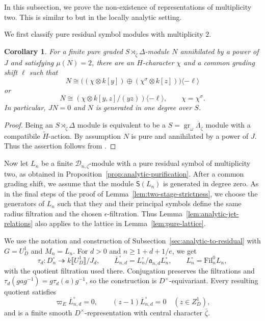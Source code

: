 \documentclass[11pt]{article}
\newtheorem{corollary}[theorem]{Corollary}
\theoremstyle{definition}
\newcommand{\gr}{\operatorname{gr}}
\begin{document}
In this subsection, we prove the non-existence of representations of multiplicity two. 
This is similar to \cite[Corollary~3.12]{HuWangPadic} but in the locally analytic setting.

We first classify pure residual symbol modules with multiplicity $2$.
\begin{corollary}\label{cor:two-symbol-classification}
For a finite pure graded $S\rtimes_{\bar\zeta}\Delta$-module $N$ 
annihilated by a power of $J$ and satisfying $\mu(N)=2$, there are an
$H$-character $\chi$ and a common grading shift $\ell$ such that
\[
 N\cong\bigl((\chi\otimes k[y])\oplus
       (\chi^\sigma\otimes k[z])\bigr)\langle-\ell\rangle
\]
or
\[
 N\cong(\chi\otimes k[y,z]/(yz))\langle-\ell\rangle,
 \qquad\chi=\chi^\sigma.
\]
In particular, $JN=0$ and $N$ is generated in one degree over $S$.
\end{corollary}
\begin{proof}
Being an $S\rtimes_{\bar\zeta}\Delta$ module is equivalent to be a $S=\gr_\omega\overline{\Lambda}_{\bar\zeta}$ module with a compatibile $\widetilde{H}$-action. 
By assumption $N$ is pure and annihilated by a power of $J$. Thus the assertion follows from \cite[Lemma~3.7]{HuWangPadic}.
\end{proof}

Now let $L_n$ be a finite $\mathscr D_{n,\zeta}$-module with a pure
residual symbol of multiplicity two, as obtained in
Proposition~\ref{prop:analytic-purification}.
After a common grading shift, we assume that the module $\mathsf S(L_n)$ is generated in degree zero.
As in the final steps of the proof of Lemma~\ref{lem:two-stage-strictness}, 
we choose the generators of $L_n$ such that they and their principal symbols 
define the same radius filtration and the chosen
$\epsilon$-filtration. Thus Lemma~\ref{lem:analytic-jet-relations}
also applies to the lattice in Lemma~\ref{lem:pure-lattice}.

We use the notation and construction of
Subsection~\ref{sec:analytic-to-residual} with $G=U_D^1$ and
$M_n=L_n$. For $d>0$ and $n\geq1+d+1/e$, we get
\[
 \tau_d:D_n^\circ\twoheadrightarrow
       k\llbracket U_D^1\rrbracket/J_d,\qquad
 \overline L_{n,d}^\circ=L_n^\circ/\mathfrak a_{n,d}L_n^\circ,
 \qquad L_n^\circ=\mathrm{Fil}_n^0L_n,
\]
with the quotient filtration used there.
Conjugation preserves the filtrations and
$\tau_d(gag^{-1})=g\tau_d(a)g^{-1}$, so the construction is
$D^\times$-equivariant. Every resulting quotient satisfies
\[
 \varpi_E\overline{L}_{n,d}^{\circ}=0,\qquad
 (z-1)\overline{L}_{n,d}^{\circ}=0\quad(z\in Z_D^1),
\]
and is a finite smooth $D^\times$-representation with central
character $\bar\zeta$.
\end{document}
